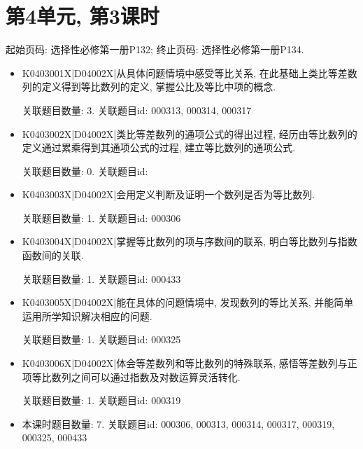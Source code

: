 \section*{第4单元, 第3课时}
起始页码: 选择性必修第一册P132; 终止页码: 选择性必修第一册P134.
\begin{itemize}
\item K0403001X|D04002X|从具体问题情境中感受等比关系, 在此基础上类比等差数列的定义得到等比数列的定义, 掌握公比及等比中项的概念.

关联题目数量: 3. 关联题目id: 000313, 000314, 000317

\item K0403002X|D04002X|类比等差数列的通项公式的得出过程, 经历由等比数列的定义通过累乘得到其通项公式的过程, 建立等比数列的通项公式.

关联题目数量: 0. 关联题目id: 

\item K0403003X|D04002X|会用定义判断及证明一个数列是否为等比数列.

关联题目数量: 1. 关联题目id: 000306

\item K0403004X|D04002X|掌握等比数列的项与序数间的联系, 明白等比数列与指数函数间的关联.

关联题目数量: 1. 关联题目id: 000433

\item K0403005X|D04002X|能在具体的问题情境中, 发现数列的等比关系, 并能简单运用所学知识解决相应的问题.

关联题目数量: 1. 关联题目id: 000325

\item K0403006X|D04002X|体会等差数列和等比数列的特殊联系, 感悟等差数列与正项等比数列之间可以通过指数及对数运算灵活转化.

关联题目数量: 1. 关联题目id: 000319

\item 本课时题目数量: 7. 关联题目id: 000306, 000313, 000314, 000317, 000319, 000325, 000433

\end{itemize}


